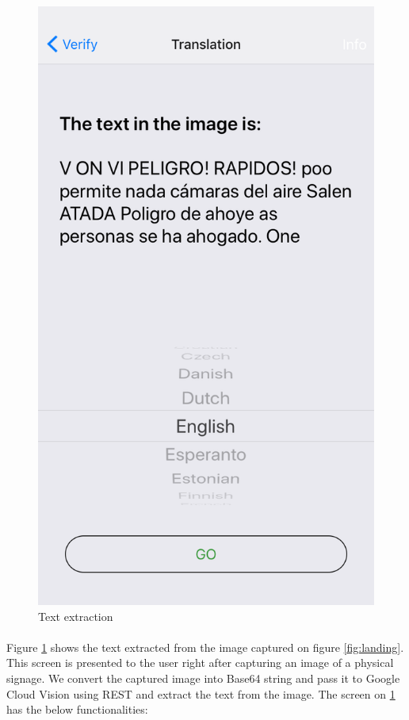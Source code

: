 \documentclass[12pt]{article}
\begin{document}
\begin{figure} [H]
\begin{minipage}{.5\textwidth}
  \includegraphics[width=0.9\linewidth]{media/2.PNG}
  \caption{Text extraction}
  \label{fig:ocr}
\end{minipage}
\end{figure}



\paragraph{}Figure \ref{fig:ocr} shows the text extracted from the image captured on figure \ref{fig:landing}. This screen is presented to the user right after capturing an image of a physical signage. We convert the captured image into Base64 string and pass it to Google Cloud Vision using REST and extract the text from the image. The screen on  \ref{fig:ocr} has the below functionalities: 
\end{document}
